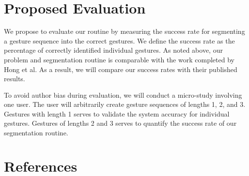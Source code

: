 \documentclass[twoside]{article}
\begin{document}
\begin{multicols}{2}
\section{Proposed Evaluation}

We propose to evaluate our routine by measuring the success rate for segmenting
a gesture sequence into the correct gestures. We define the success rate as the
percentage of correctly identified individual gestures. As noted above, our problem
and segmentation routine is comparable with the work completed by Hong et
al\cite{hong1998segmentation}. As a result, we will compare our success rates
with their published results.

To avoid author bias during evaluation, we will conduct a micro-study involving
one user. The user will arbitrarily create gesture sequences of
lengths 1, 2, and 3. Gestures with length 1 serves to validate the system
accuracy for individual gestures. Gestures of lengths 2 and 3 serves to quantify
the success rate of our segmentation routine.

\section{References}

\begin{spacing}{0.9}
%
\begingroup
\renewcommand{\section}[2]{}%

\endgroup
\end{spacing}

\end{multicols}
\end{document}
